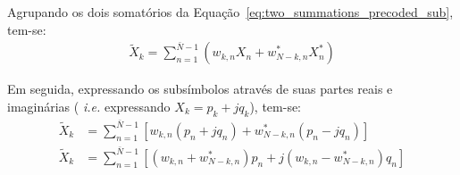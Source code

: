Agrupando os dois somatórios da Equação~\ref{eq:two_summations_precoded_sub}, tem-se:
\begin{align}
\tilde{X}_k = \sum \limits_{n=1}^{\bar{N} - 1} \left(w_{k,n}X_n + w_{N-k,n}^* X_n^* \right)
\end{align}

Em seguida, expressando os subsímbolos através de suas partes reais e imaginárias ( \textsl{i.e.} expressando $X_k = p_k + jq_k$), tem-se:
\begin{align}
\tilde{X}_k &= \sum \limits_{n=1}^{\bar{N} - 1} \left[ w_{k,n} ( p_n + jq_n) + w_{N-k,n}^* ( p_n - jq_n) \right] \nonumber\\
\tilde{X}_k &= \sum \limits_{n=1}^{\bar{N} - 1} \left[  \left( w_{k,n} + w_{N-k,n}^*\right)p_n   + j\left( w_{k,n} - w_{N-k,n}^*\right)q_n \right]
\end{align}

\begin{comment}
Meanwhile, since the DC and Nyquist lines are hermitian symmetric line vectors, the DC and Nyquist subsymbols are given by:
\begin{align}
\tilde{X}_0 &= 2 \Re\left\{ \sum \limits_{n=1}^{\bar{N} - 1} W_{0,n}X_0 \right\}\\
\tilde{X}_{\frac{N}{2}} &= 2 \Re\left\{ \sum \limits_{n=1}^{\bar{N} - 1} W_{\frac{N}{2},n}X_{\frac{N}{2}} \right\}
\end{align}


Substituting the fact that the real part of the product between complex numbers is the product of the real parts minus the product of the imaginary parts,  while the real part of a sum is the sum of the real parts, yields:
\begin{align}
\tilde{X}_0 &= 2\sum \limits_{n=1}^{N/2 - 1}  \Re\left\{ W_{0,n}X_0 \right\} \nonumber\\
\tilde{X}_0 &= 2\sum \limits_{n=1}^{N/2 - 1}  \left( \Re\{ W_{0,n} \} \Re\{X_0\} - \Im\{W_{0,n} \}\Im\{X_0\} \right)\nonumber\\
\tilde{X}_0 &= 2\sum \limits_{n=1}^{N/2 - 1}  \left( \Re\{ W_{0,n} \} p_0 - \Im\{W_{0,n} \} q_0 \right)
\end{align}

Similarly, the Nyquist subsymbol is given by:
\begin{align}
\tilde{X}_{\frac{N}{2}} &= 2\sum \limits_{n=1}^{N/2 - 1}  \left( \Re\{ W_{{\frac{N}{2}},n} \} p_{\frac{N}{2}} - \Im\{W_{{\frac{N}{2}},n} \} q_{\frac{N}{2}} \right)
\end{align}
\end{comment}

